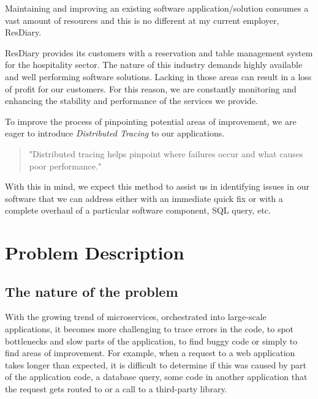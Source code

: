 \documentclass[11pt]{article}
\begin{document}
Maintaining and improving an existing software application/solution consumes a vast amount of resources and this is no different at my current employer, ResDiary.

ResDiary provides its customers with a reservation and table management system for the hospitality sector. The nature of this industry demands highly available and well performing software solutions. Lacking in those areas can result in a loss of profit for our customers. For this reason, we are constantly monitoring and enhancing the stability and performance of the services we provide.

To improve the process of pinpointing potential areas of improvement, we are eager to introduce \textit{Distributed Tracing} to our applications.
\begin{quote}
    "Distributed tracing helps pinpoint where failures occur and what causes poor performance." \cite{opentracing}
\end{quote}  
With this in mind, we expect this method to assist us in identifying issues in our software that we can address either with an immediate quick fix or with a complete overhaul of a particular software component, SQL query, etc.

\section{Problem Description}


\subsection{The nature of the problem}

With the growing trend of microservices, orchestrated into large-scale applications, it becomes more challenging to trace errors in the code, to spot bottlenecks and slow parts of the application, to find buggy code or simply to find areas of improvement. For example, when a request to a web application takes longer than expected, it is difficult to determine if this was caused by part of the application code, a database query, some code in another application that the request gets routed to or a call to a third-party library.
\end{document}
